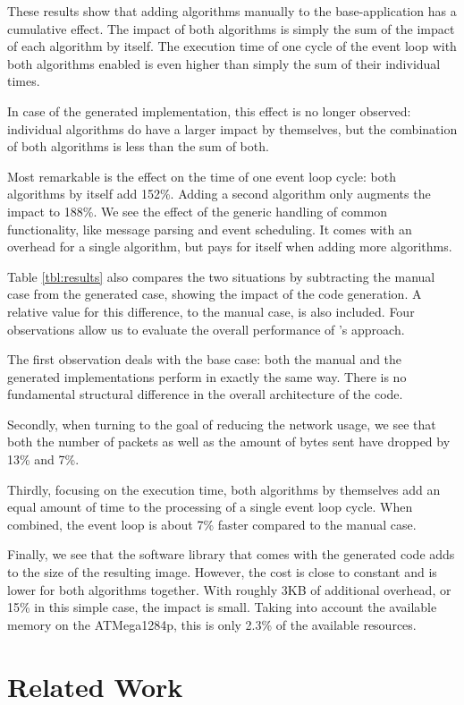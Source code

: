 \documentclass[3p,times,procedia]{elsarticle}
\begin{document}
These results show that adding algorithms manually to the base-application has
a cumulative effect. The impact of both algorithms is simply the sum of the
impact of each algorithm by itself. The execution time of one cycle of the
event loop with both algorithms enabled is even higher than simply the sum of
their individual times.

In case of the generated implementation, this effect is no longer observed:
individual algorithms do have a larger impact by themselves, but the
combination of both algorithms is less than the sum of both.

Most remarkable is the effect on the time of one event loop cycle: both
algorithms by itself add 152\%. Adding a second algorithm only augments the
impact to 188\%. We see the effect of the generic handling of common
functionality, like message parsing and event scheduling. It comes with an
overhead for a single algorithm, but pays for itself when adding more
algorithms.

Table \ref{tbl:results} also compares the two situations by subtracting the
manual case from the generated case, showing the impact of the code generation.
A relative value for this difference, to the manual case, is also included.
Four observations allow us to evaluate the overall performance of \NAME's
approach.

The first observation deals with the base case: both the manual and the
generated implementations perform in exactly the same way. There is no
fundamental structural difference in the overall architecture of the code.

Secondly, when turning to the goal of reducing the network usage, we see that
both the number of packets as well as the amount of bytes sent have dropped by
13\% and 7\%.

Thirdly, focusing on the execution time, both algorithms by themselves add an
equal amount of time to the processing of a single event loop cycle. When
combined, the event loop is about 7\% faster compared to the manual case.

Finally, we see that the software library that comes with the generated code
adds to the size of the resulting image. However, the cost is close to constant
and is lower for both algorithms together. With roughly 3KB of additional
overhead, or 15\% in this simple case, the impact is small. Taking into account
the available memory on the ATMega1284p, this is only 2.3\% of the available
resources.

\section{Related Work}
\label{related}
\end{document}
